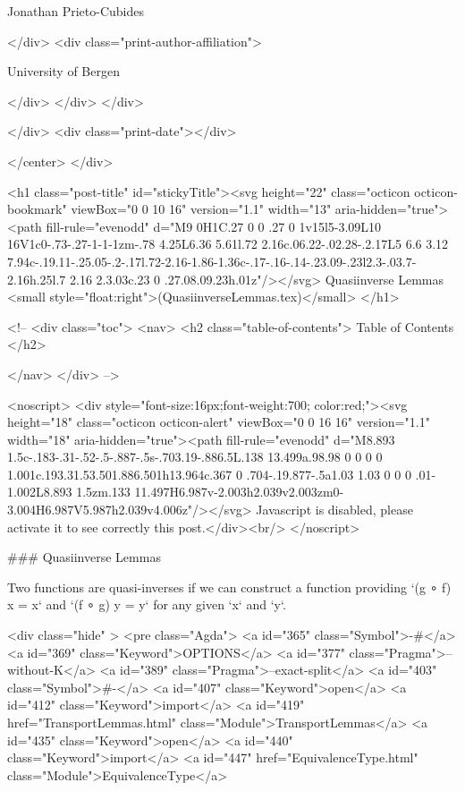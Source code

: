                   Jonathan Prieto-Cubides
                
              </div>
              <div class="print-author-affiliation">
                
                  University of Bergen
                
                </div>
            </div>
          </div>
          
          
        </div>
        <div class="print-date"></div>
        
        
    </center>
  </div>

  

  <h1 class="post-title" id="stickyTitle"><svg height="22" class="octicon octicon-bookmark" viewBox="0 0 10 16" version="1.1" width="13" aria-hidden="true"><path fill-rule="evenodd" d="M9 0H1C.27 0 0 .27 0 1v15l5-3.09L10 16V1c0-.73-.27-1-1-1zm-.78 4.25L6.36 5.61l.72 2.16c.06.22-.02.28-.2.17L5 6.6 3.12 7.94c-.19.11-.25.05-.2-.17l.72-2.16-1.86-1.36c-.17-.16-.14-.23.09-.23l2.3-.03.7-2.16h.25l.7 2.16 2.3.03c.23 0 .27.08.09.23h.01z"/></svg> Quasiinverse Lemmas <small style="float:right">(QuasiinverseLemmas.tex)</small>
  </h1>

  <!-- 
  <div class="toc">
    <nav>
    <h2 class="table-of-contents"> Table of Contents </h2>
      

    </nav>
  </div>
   -->

  <noscript>
  <div style="font-size:16px;font-weight:700; color:red;"><svg height="18" class="octicon octicon-alert" viewBox="0 0 16 16" version="1.1" width="18" aria-hidden="true"><path fill-rule="evenodd" d="M8.893 1.5c-.183-.31-.52-.5-.887-.5s-.703.19-.886.5L.138 13.499a.98.98 0 0 0 0 1.001c.193.31.53.501.886.501h13.964c.367 0 .704-.19.877-.5a1.03 1.03 0 0 0 .01-1.002L8.893 1.5zm.133 11.497H6.987v-2.003h2.039v2.003zm0-3.004H6.987V5.987h2.039v4.006z"/></svg> Javascript is disabled, please activate it to see correctly this post.</div><br/>
  </noscript>

  ### Quasiinverse Lemmas

Two functions are quasi-inverses if we can construct a function providing
`(g ∘ f) x = x` and `(f ∘ g) y = y` for any given `x` and `y`.

<div class="hide" >
<pre class="Agda">
<a id="365" class="Symbol">{-#</a> <a id="369" class="Keyword">OPTIONS</a> <a id="377" class="Pragma">--without-K</a> <a id="389" class="Pragma">--exact-split</a> <a id="403" class="Symbol">#-}</a>
<a id="407" class="Keyword">open</a> <a id="412" class="Keyword">import</a> <a id="419" href="TransportLemmas.html" class="Module">TransportLemmas</a>
<a id="435" class="Keyword">open</a> <a id="440" class="Keyword">import</a> <a id="447" href="EquivalenceType.html" class="Module">EquivalenceType</a>

